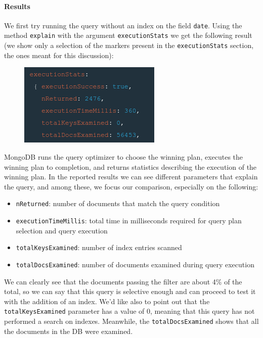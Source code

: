 \begin{enumerate}
    \paragraph{Results}
    We first try running the query without an index on the field \verb|date|.
    Using the method \verb|explain| with the argument \verb|executionStats| we get the following result (we show only a selection of the markers present in the \verb|executionStats| section, the ones meant for this discussion):
    \begin{figure}[H]
        \begin{center}
            \includegraphics[width=0.45\linewidth]{ImagesMongoDB/result_query1mongodb1}
            \label{fig:result_query1mongodb1}%
        \end{center}
    \end{figure}
    MongoDB runs the query optimizer to choose the winning plan, executes the winning plan to completion, and returns statistics describing the execution of the winning plan.
    In the reported results we can see different parameters that explain the query, and among these, we focus our comparison, especially on the following:
    \begin{itemize}
        \item \verb|nReturned|: number of documents that match the query condition
        \item \verb|executionTimeMillis|: total time in milliseconds required for query plan selection and query execution
        \item \verb|totalKeysExamined|: number of index entries scanned
        \item \verb|totalDocsExamined|: number of documents examined during query execution
    \end{itemize}
    We can clearly see that the documents passing the filter are about 4\% of the total, so we can say that this query is selective enough and can proceed to test it with the addition of an index.
    We'd like also to point out that the \verb|totalKeysExamined| parameter has a value of 0, meaning that this query has not performed a search on indexes.
    Meanwhile, the \verb|totalDocsExamined| shows that all the documents in the DB were examined.

\end{enumerate}
